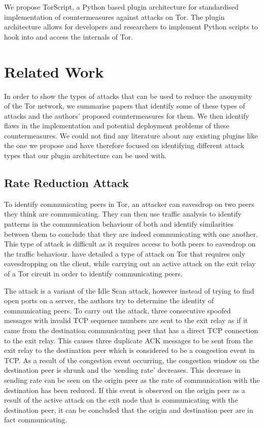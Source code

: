 \documentclass[9pt,technote]{IEEEtran}
\begin{document}
We propose TorScript, a Python based plugin architecture for standardised implementation of
countermeasures against attacks on Tor. The plugin architecture allows for
developers and researchers to implement Python scripts to hook into and access
the internals of Tor.

\section{Related Work} 
\label{sec:relatedwork}
In order to show the types of attacks that can be used to reduce the anonymity of the Tor network, we summarise papers that identify some of these types of attacks and the authors' proposed countermeasures for them. We then identify flaws in the implementation and potential deployment problems of these countermeasures. We could not find any literature about any existing plugins like the one we propose and have therefore focused on identifying different attack types that our plugin architecture can be used with.\\

\subsection{Rate Reduction Attack}
To identify communicating peers in Tor, an attacker can eavesdrop on two peers they think are communicating. They can then use traffic analysis to identify patterns in the communication behaviour of both and identify similarities between them to conclude that they are indeed communicating with one another. This type of attack is difficult as it requires access to both peers to eavesdrop on the traffic behaviour. \citeauthor{gilad2012spying} have detailed a type of attack on Tor that requires only eavesdropping on the client, while carrying out an active attack on the exit relay of a Tor circuit in order to identify communicating peers.

The attack is a variant of the Idle Scan attack, however instead of trying to find open ports on a server, the authors try to determine the identity of communicating peers. To carry out the attack, three consecutive spoofed messages with invalid TCP sequence numbers are sent to the exit relay as if it came from the destination communicating peer that has a direct TCP connection to the exit relay. This causes three duplicate ACK messages to be sent from the exit relay to the destination peer which is considered to be a congestion event in TCP. As a result of the congestion event occurring, the congestion window on the destination peer is shrunk and the `sending rate' decreases. This decrease in sending rate can be seen on the origin peer as the rate of communication with the destination has been reduced. If this event is observed on the origin peer as a result of the active attack on the exit node that is communicating with the destination peer, it can be concluded that the origin and destination peer are in fact communicating.
\end{document}
